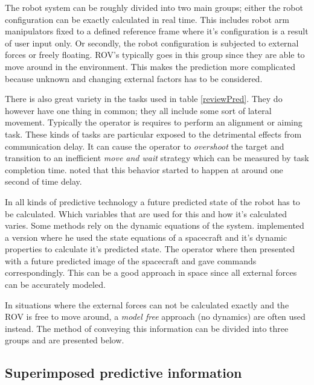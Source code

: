 The robot system can be roughly divided into two main groups; either the robot configuration can be exactly calculated in real time. This includes robot arm manipulators fixed to a defined reference frame where it's configuration is a result of user input only. Or secondly, the robot configuration is subjected to external forces or freely floating. ROV's typically goes in this group since they are able to move around in the environment. This makes the prediction more complicated because unknown and changing external factors has to be considered.

There is also great variety in the tasks used in table \ref{reviewPred}. They do however have one thing in common; they all include some sort of lateral movement. Typically the operator is requires to perform an alignment or aiming task. These kinds of tasks are particular exposed to the detrimental effects from communication delay. It can cause the operator to \emph{overshoot} the target and transition to an inefficient \emph{move and wait} strategy which can be measured by task completion time. \citep{Lane2002} noted that this behavior started to happen at around one second of time delay.

In all kinds of predictive technology a future predicted state of the robot has to be calculated. Which variables that are used for this and how it's calculated varies. Some methods rely on the dynamic equations of the system. \citep{Zhang2017} implemented a version where he used the state equations of a spacecraft and it's dynamic properties to calculate it's predicted state. The operator where then presented with a future predicted image of the spacecraft and gave commands correspondingly. This can be a good approach in space since all external forces can be accurately modeled.

In situations where the external forces can not be calculated exactly and the ROV is free to move around, a \emph{model free} approach (no dynamics) are often used instead. The method of conveying this information can be divided into three groups and are presented below.




\subsection{Superimposed predictive information}

